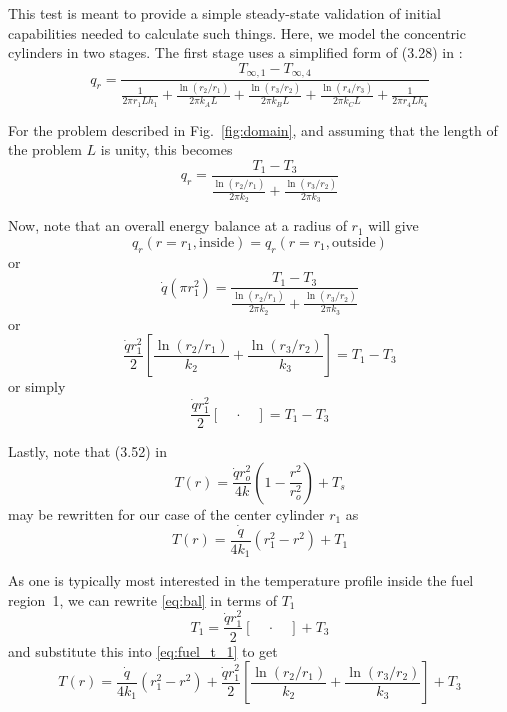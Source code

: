 \documentclass[12pt]{article}
\begin{document}
This test is meant to provide a simple steady-state validation of initial capabilities needed to calculate
such things. Here, we model the concentric cylinders in two stages. The first stage uses a simplified form
of (3.28) in
\cite{incropera81}:
%
\begin{equation}
q_r = \frac{T_{\infty,1} - T_{\infty, 4}}{\frac{1}{2\pi r_1 L h_1} + \frac{\ln (r_2 / r_1)}{2\pi k_A L} +
\frac{\ln (r_3 / r_2)}{2 \pi k_B L} + \frac{\ln(r_4/r_3)}{2\pi k_C L} + \frac{1}{2\pi r_4 L h_4}}
\end{equation}

For the problem described in Fig.~\ref{fig:domain}, and assuming that the length of the problem $L$ is
unity, this becomes
%
\begin{equation}
q_r = \frac{T_{1} - T_{3}}{\frac{\ln (r_2 / r_1)}{2\pi k_2} +
\frac{\ln (r_3 / r_2)}{2 \pi k_3} }
\label{eq:resist}
\end{equation}

Now, note that an overall energy balance at a radius of $r_1$ will give
%
\begin{equation}
q_r(r=r_1, \mathrm{inside}) =
q_r(r=r_1, \mathrm{outside}) 
\end{equation}
or
\begin{equation}
\dot{q} (\pi r_1^2) =
\frac{T_{1} - T_{3}}{\frac{\ln (r_2 / r_1)}{2\pi k_2} +
\frac{\ln (r_3 / r_2)}{2 \pi k_3} }
\end{equation}
or
\begin{equation}
\frac{\dot{q} r_1^2}{2} \left[
\frac{\ln (r_2 / r_1)}{k_2} +
\frac{\ln (r_3 / r_2)}{k_3} \right] =
T_{1} - T_{3}
\end{equation}
or simply
\begin{equation}
\frac{\dot{q} r_1^2}{2} \left[ \quad \cdot \quad \right] =
T_{1} - T_{3}
\label{eq:bal}
\end{equation}

Lastly, note that (3.52) in \cite{incropera81}
%
\begin{equation}
T(r) = \frac{\dot{q} r_o^2}{4 k} \left( 1 - \frac{r^2}{r_o^2}\right) + T_s
\end{equation}
%
may be rewritten for our case of the center cylinder $r_1$ as
%
\begin{equation}
T(r) = \frac{\dot{q}}{4 k_1} \left( r_1^2 - r^2\right) + T_1
\label{eq:fuel_t_1}
\end{equation}

As one is typically most interested in the temperature profile inside the fuel region~1, we can rewrite
\eqref{eq:bal} in terms of $T_1$
%
\begin{equation}
T_{1} =
\frac{\dot{q} r_1^2}{2} \left[ \quad \cdot \quad \right]
+ T_{3}
\end{equation}
%
and substitute this into \eqref{eq:fuel_t_1} to get
%
\begin{equation}
T(r) = \frac{\dot{q}}{4 k_1} \left( r_1^2 - r^2\right) + 
\frac{\dot{q} r_1^2}{2} \left[
\frac{\ln (r_2 / r_1)}{k_2} +
\frac{\ln (r_3 / r_2)}{k_3} \right] + T_3
\label{eq:fuel_t_2}
\end{equation}
\end{document}
